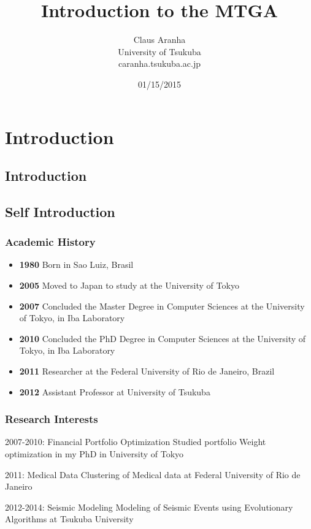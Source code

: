 \documentclass{beamer}[10pt]
\title[]{Introduction to the MTGA}
\author[Claus Aranha]{Claus Aranha\\{\footnotesize University of
    Tsukuba\\caranha\@@cs.tsukuba.ac.jp}}
\date{01/15/2015}
\begin{document}
\section{Introduction}
\subsection{Introduction}
\begin{frame}
  \maketitle
\end{frame}

\subsection{Self Introduction}
\begin{frame}
  \frametitle{Academic History}
  \begin{itemize}
    \item {\bf 1980} Born in Sao Luiz, Brasil
    \item {\bf 2005} Moved to Japan to study at the University of Tokyo
    \item {\bf 2007} Concluded the Master Degree in Computer Sciences
      at the University of Tokyo, in Iba Laboratory
    \item {\bf 2010} Concluded the PhD Degree in Computer Sciences at
      the University of Tokyo, in Iba Laboratory
    \item {\bf 2011} Researcher at the Federal University of Rio de
      Janeiro, Brazil
    \item {\bf 2012} Assistant Professor at University of Tsukuba
  \end{itemize}
\end{frame}

\begin{frame}
  \frametitle{Research Interests}
  \begin{block}{2007-2010: Financial Portfolio Optimization}
    Studied portfolio Weight optimization in my PhD in University of Tokyo
  \end{block}
  \begin{block}{2011: Medical Data}
    Clustering of Medical data at Federal University of Rio de Janeiro
  \end{block}
  \begin{block}{2012-2014: Seismic Modeling}
    Modeling of Seismic Events using Evolutionary Algorithms at Tsukuba University
  \end{block}
\end{frame}
\end{document}
